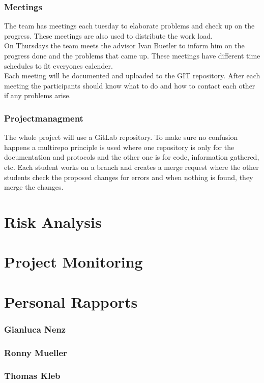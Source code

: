 \subsubsection*{Meetings}
The team has meetings each tuesday to elaborate problems and check up on the progress. These meetings are also used to distribute the work load. \\
On Thursdays the team meets the advisor Ivan Buetler to inform him on the progress done and the problems that came up. These meetings have different time schedules to fit everyones calender. \\
Each meeting will be documented and uploaded to the GIT repository. After each meeting the participants should know what to do and how to contact each other if any problems arise.


\subsubsection*{Projectmanagment}
The whole project will use a GitLab repository. To make sure no confusion happens a multirepo principle is used where one repository is only for the documentation and protocols and the other one is for code, information gathered, etc. Each student works on a branch and creates a merge request where the other students check the proposed changes for errors and when nothing is found, they merge the changes. 



\section{Risk Analysis}


\section{Project Monitoring}


\section{Personal Rapports}

\subsubsection*{Gianluca Nenz}


\subsubsection*{Ronny Mueller}


\subsubsection*{Thomas Kleb}

